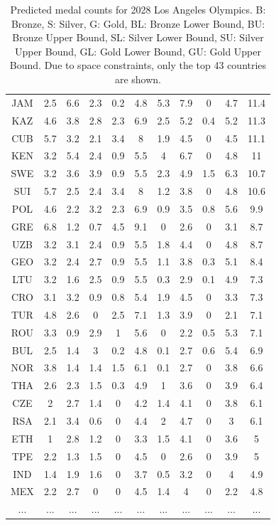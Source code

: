 \documentclass{mcmthesis}
\begin{document}
\begin{table}[htbp]
\begin{tabular}{|c|c|c|c|c|c|c|c|c|c|c|}
        JAM & 2.5 & 6.6 & 2.3 & 0.2 & 4.8 & 5.3 & 7.9 & 0 & 4.7 & 11.4 \\
        KAZ & 4.6 & 3.8 & 2.8 & 2.3 & 6.9 & 2.5 & 5.2 & 0.4 & 5.2 & 11.3 \\
        CUB & 5.7 & 3.2 & 2.1 & 3.4 & 8 & 1.9 & 4.5 & 0 & 4.5 & 11.1 \\
        KEN & 3.2 & 5.4 & 2.4 & 0.9 & 5.5 & 4 & 6.7 & 0 & 4.8 & 11 \\
        SWE & 3.2 & 3.6 & 3.9 & 0.9 & 5.5 & 2.3 & 4.9 & 1.5 & 6.3 & 10.7 \\
        SUI & 5.7 & 2.5 & 2.4 & 3.4 & 8 & 1.2 & 3.8 & 0 & 4.8 & 10.6 \\
        POL & 4.6 & 2.2 & 3.2 & 2.3 & 6.9 & 0.9 & 3.5 & 0.8 & 5.6 & 9.9 \\
        GRE & 6.8 & 1.2 & 0.7 & 4.5 & 9.1 & 0 & 2.6 & 0 & 3.1 & 8.7 \\
        UZB & 3.2 & 3.1 & 2.4 & 0.9 & 5.5 & 1.8 & 4.4 & 0 & 4.8 & 8.7 \\
        GEO & 3.2 & 2.4 & 2.7 & 0.9 & 5.5 & 1.1 & 3.8 & 0.3 & 5.1 & 8.4 \\
        LTU & 3.2 & 1.6 & 2.5 & 0.9 & 5.5 & 0.3 & 2.9 & 0.1 & 4.9 & 7.3 \\
        CRO & 3.1 & 3.2 & 0.9 & 0.8 & 5.4 & 1.9 & 4.5 & 0 & 3.3 & 7.3 \\
        TUR & 4.8 & 2.6 & 0 & 2.5 & 7.1 & 1.3 & 3.9 & 0 & 2.1 & 7.1 \\
        ROU & 3.3 & 0.9 & 2.9 & 1 & 5.6 & 0 & 2.2 & 0.5 & 5.3 & 7.1 \\
        BUL & 2.5 & 1.4 & 3 & 0.2 & 4.8 & 0.1 & 2.7 & 0.6 & 5.4 & 6.9 \\
        NOR & 3.8 & 1.4 & 1.4 & 1.5 & 6.1 & 0.1 & 2.7 & 0 & 3.8 & 6.6 \\
        THA & 2.6 & 2.3 & 1.5 & 0.3 & 4.9 & 1 & 3.6 & 0 & 3.9 & 6.4 \\
        CZE & 2 & 2.7 & 1.4 & 0 & 4.2 & 1.4 & 4.1 & 0 & 3.8 & 6.1 \\
        RSA & 2.1 & 3.4 & 0.6 & 0 & 4.4 & 2 & 4.7 & 0 & 3 & 6.1 \\
        ETH & 1 & 2.8 & 1.2 & 0 & 3.3 & 1.5 & 4.1 & 0 & 3.6 & 5 \\
        TPE & 2.2 & 1.3 & 1.5 & 0 & 4.5 & 0 & 2.6 & 0 & 3.9 & 5 \\
        IND & 1.4 & 1.9 & 1.6 & 0 & 3.7 & 0.5 & 3.2 & 0 & 4 & 4.9 \\
        MEX & 2.2 & 2.7 & 0 & 0 & 4.5 & 1.4 & 4 & 0 & 2.2 & 4.8 \\
        ... & ... & ... & ... & ... & ... & ... & ... & ... & ... & ... \\
    \end{tabular}
    \caption{Predicted medal counts for 2028 Los Angeles Olympics. B: Bronze, S: Silver, G: Gold, BL: Bronze Lower Bound, BU: Bronze Upper Bound, SL: Silver Lower Bound, SU: Silver Upper Bound, GL: Gold Lower Bound, GU: Gold Upper Bound. Due to space constraints, only the top 43 countries are shown.}
    \label{tab:medal_counts}
\end{table}
\end{document}

